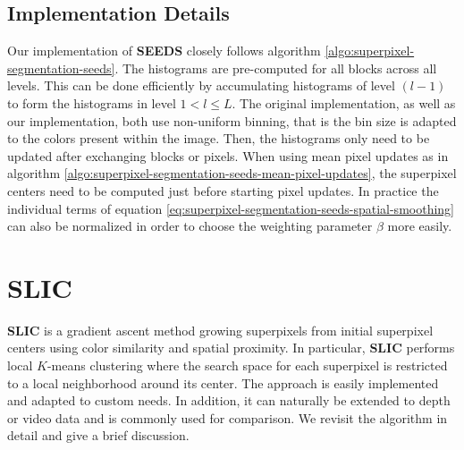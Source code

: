 \subsection{Implementation Details}

Our implementation of \textbf{SEEDS} closely follows algorithm \ref{algo:superpixel-segmentation-seeds}. The histograms are pre-computed for all blocks across all levels. This can be done efficiently by accumulating histograms of level $(l - 1)$ to form the histograms in level $1 < l \leq L$. The original implementation, as well as our implementation, both use non-uniform binning, that is the bin size is adapted to the colors present within the image. Then, the histograms only need to be updated after exchanging blocks or pixels. When using mean pixel updates as in algorithm \ref{algo:superpixel-segmentation-seeds-mean-pixel-updates}, the superpixel centers need to be computed just before starting pixel updates. In practice the individual terms of equation \eqref{eq:superpixel-segmentation-seeds-spatial-smoothing} can also be normalized in order to choose the weighting parameter $\beta$ more easily.

\section{SLIC}
\label{section:superpixel-segmentation-slic}

\textbf{SLIC} is a gradient ascent method growing superpixels from initial superpixel centers using color similarity and spatial proximity. In particular, \textbf{SLIC} performs local $K$-means clustering where the search space for each superpixel is restricted to a local neighborhood around its center. The approach is easily implemented and adapted to custom needs. In addition, it can naturally be extended to depth or video data and is commonly used for comparison. We revisit the algorithm in detail and give a brief discussion.


